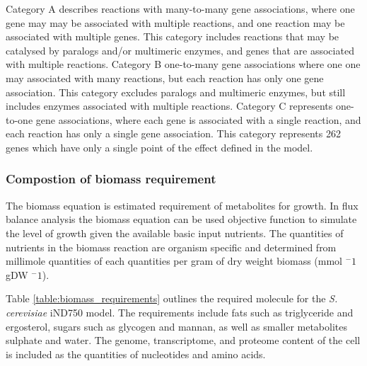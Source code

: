 Category A describes reactions with many-to-many gene associations, where one gene may may be associated with multiple reactions, and one reaction may be associated with multiple genes. This category includes reactions that may be catalysed by paralogs and/or multimeric enzymes, and genes that are associated with multiple reactions. Category B one-to-many gene associations where one one may associated with many reactions, but each reaction has only one gene association. This category excludes paralogs and multimeric enzymes, but still includes enzymes associated with multiple reactions. Category C represents one-to-one gene associations, where each gene is associated with a single reaction, and each reaction has only a single gene association. This category represents 262 genes which have only a single point of the effect defined in the model.

\subsubsection{Compostion of biomass requirement}

The biomass equation is estimated requirement of metabolites for growth. In flux balance analysis the biomass equation can be used objective function to simulate the level of growth given the available basic input nutrients. The quantities of nutrients in the biomass reaction are organism specific and determined from millimole quantities of each quantities per gram of dry weight biomass (mmol $^-1$ gDW $^-1$).
 
Table \vref{table:biomass_requirements} outlines the required molecule for the \emph{S. cerevisiae} iND750 model. The requirements include fats such as triglyceride and ergosterol, sugars such as glycogen and mannan, as well as smaller metabolites sulphate and water. The genome, transcriptome, and proteome content of the cell is included as the quantities of nucleotides and amino acids.


